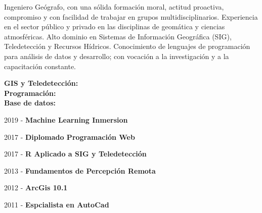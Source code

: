 \justify
Ingeniero Geógrafo, con una sólida formación moral, actitud proactiva, compromiso y con facilidad de trabajar en grupos multidisciplinarios. Experiencia en el sector público y privado en las disciplinas de geomática y ciencias atmosféricas. Alto dominio en Sistemas de Información Geográﬁca (SIG), Teledetección y Recursos Hídricos. Conocimiento de lenguajes de programación para análisis de datos y desarrollo; con vocación a la investigación y a la capacitación constante.






\textbf{GIS y Teledetección:}\\
\divider\smallskip
\textbf{Programación:}\\
\cvtag{\LaTeX}
\divider\smallskip
\textbf{Base de datos:}\\



\item 2019 - \textbf{Machine Learning Inmersion}
\item 2017 - \textbf{Diplomado Programación Web}
\item 2017 - \textbf{R Aplicado a SIG y Teledetección}
\item 2013 - \textbf{Fundamentos de Percepción Remota}
\item 2012 - \textbf{ArcGis 10.1}
\item 2011 - \textbf{Espcialista en AutoCad}

\divider

